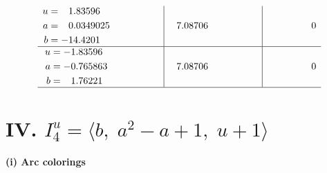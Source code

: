 \documentclass[1p]{elsarticle_modified}
\theoremstyle{definition}
\begin{document}
$$\begin{array}{c|c|c}
\begin{aligned}
u &= \phantom{-}1.83596\phantom{ +0.000000I} \\
a &= \phantom{-}0.0349025\phantom{ +0.000000I} \\
b &= -14.4201\phantom{ +0.000000I}\end{aligned}
 & \phantom{-}7.08706\phantom{ +0.000000I} & \phantom{-0.000000 } 0 \\ \hline\begin{aligned}
u &= -1.83596\phantom{ +0.000000I} \\
a &= -0.765863\phantom{ +0.000000I} \\
b &= \phantom{-}1.76221\phantom{ +0.000000I}\end{aligned}
 & \phantom{-}7.08706\phantom{ +0.000000I} & \phantom{-0.000000 } 0\\
 \hline 
 \end{array}$$\newpage\newpage\renewcommand{\arraystretch}{1}
\centering \section*{IV. $I^u_{4}= \langle b,\;a^2- a+1,\;u+1 \rangle$}
\flushleft \textbf{(i) Arc colorings}\\
\end{document}
